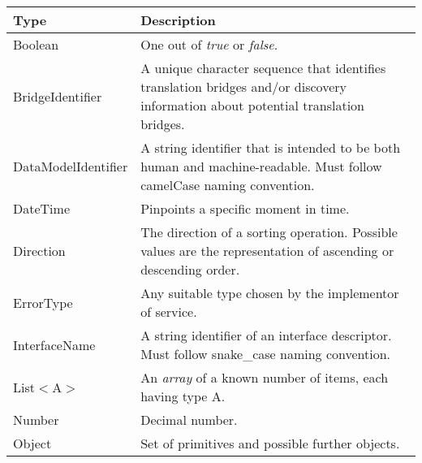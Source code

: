 \documentclass[a4paper]{arrowhead}
\newcommand{\pdef}[1]{{\textcolor{ArrowheadGrey}{#1\label{sec:model:primitives:#1}\label{sec:model:primitives:#1s}\label{sec:model:primitives:#1es}}}}
\begin{document}
\begin{table}[ht!]
\begin{tabularx}{\textwidth}{| p{5cm} | X |} \hline
\rowcolor{gray!33} Type & Description \\ \hline
\pdef{Boolean} & One out of \textit{true} or \textit{false}. \\ \hline
\pdef{BridgeIdentifier} & A unique character sequence that identifies translation bridges and/or discovery information about potential translation bridges. \\ \hline
\pdef{DataModelIdentifier} & A string identifier that is intended to be both human and machine-readable. Must follow camelCase naming convention. \\ \hline
\pdef{DateTime}         & Pinpoints a specific moment in time. \\ \hline
\pdef{Direction}        & The direction of a sorting operation. Possible values are the representation of ascending or descending order. \\ \hline
\pdef{ErrorType}        & Any suitable type chosen by the implementor of service. \\ \hline
\pdef{InterfaceName}    & A string identifier of an interface descriptor. Must follow snake\_case naming convention. \\ \hline
\pdef{List}$<$A$>$      & An \textit{array} of a known number of items, each having type A. \\ \hline
\pdef{Number}           & Decimal number. \\ \hline
\pdef{Object}           & Set of primitives and possible further objects. \\ \hline
\end{tabularx}
\end{table}
\end{document}
